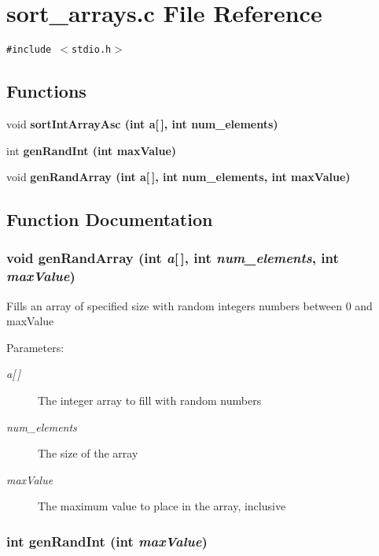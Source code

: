 \section{sort\_\-arrays.c File Reference}
\label{sort__arrays_8c}
{\tt \#include $<$stdio.h$>$}\par
\subsection*{Functions}
\begin{CompactItemize}
\item 
void \bf{sort\-Int\-Array\-Asc} (int a[$\,$], int num\_\-elements)
\item 
int \bf{gen\-Rand\-Int} (int max\-Value)
\item 
void \bf{gen\-Rand\-Array} (int a[$\,$], int num\_\-elements, int max\-Value)
\end{CompactItemize}


\subsection{Function Documentation}
\subsubsection{\setlength{\rightskip}{0pt plus 5cm}void gen\-Rand\-Array (int {\em a}[$\,$], int {\em num\_\-elements}, int {\em max\-Value})}\label{sort__arrays_8c_f399b1d8920b6b3181e640745d3420dc}


Fills an array of specified size with random integers numbers between 0 and max\-Value \begin{Desc}
\item[Parameters:]
\begin{description}
\item[{\em a\mbox{[}$\,$\mbox{]}}]The integer array to fill with random numbers \item[{\em num\_\-elements}]The size of the array \item[{\em max\-Value}]The maximum value to place in the array, inclusive \end{description}
\end{Desc}
\subsubsection{\setlength{\rightskip}{0pt plus 5cm}int gen\-Rand\-Int (int {\em max\-Value})}\label{sort__arrays_8c_c4418fa1a8e694adecb1016209595ae1}


